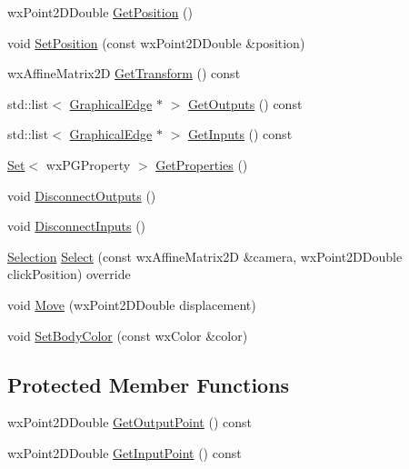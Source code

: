 \begin{DoxyCompactItemize}
\item 
wx\+Point2\+D\+Double \hyperlink{class_graphical_node_a87de11aad81e7b4a3baf53d47034e5f5}{Get\+Position} ()
\item 
void \hyperlink{class_graphical_node_a61cb6a7d32ae7db370336639d83fc2bd}{Set\+Position} (const wx\+Point2\+D\+Double \&position)
\item 
wx\+Affine\+Matrix2D \hyperlink{class_graphical_node_a3556bb1d323f16fd394211cf82239f01}{Get\+Transform} () const
\item 
std\+::list$<$ \hyperlink{class_graphical_edge}{Graphical\+Edge} $\ast$ $>$ \hyperlink{class_graphical_node_a2d4169669b106f7351178e4fbc60be85}{Get\+Outputs} () const
\item 
std\+::list$<$ \hyperlink{class_graphical_edge}{Graphical\+Edge} $\ast$ $>$ \hyperlink{class_graphical_node_a338a09b81d0be860210659f312fd5347}{Get\+Inputs} () const
\item 
\hyperlink{class_set}{Set}$<$ wx\+P\+G\+Property $>$ \hyperlink{class_graphical_node_a9d89885db9553820d3557a801a83b9de}{Get\+Properties} ()
\item 
void \hyperlink{class_graphical_node_a80e76a5ae9dd27b0445a1e6943074852}{Disconnect\+Outputs} ()
\item 
void \hyperlink{class_graphical_node_adf7b68c28c70426681cef018d34f8988}{Disconnect\+Inputs} ()
\item 
\hyperlink{struct_selection}{Selection} \hyperlink{class_graphical_node_ac73e20f3d4c5cca556e0140ef558f6a4}{Select} (const wx\+Affine\+Matrix2D \&camera, wx\+Point2\+D\+Double click\+Position) override
\item 
void \hyperlink{class_graphical_node_a430fbd68a5d907ed9e73981ab3c499fb}{Move} (wx\+Point2\+D\+Double displacement)
\item 
void \hyperlink{class_graphical_node_ae0cbf2cfe00306e2cfc610c5eb4cb89b}{Set\+Body\+Color} (const wx\+Color \&color)
\end{DoxyCompactItemize}
\subsection*{Protected Member Functions}
\begin{DoxyCompactItemize}
\item 
wx\+Point2\+D\+Double \hyperlink{class_graphical_node_a5e0a98450d511bb024e1746ab42d34c4}{Get\+Output\+Point} () const
\item 
wx\+Point2\+D\+Double \hyperlink{class_graphical_node_a29991fc9117db0975aa1a61d0df48822}{Get\+Input\+Point} () const
\end{DoxyCompactItemize}
